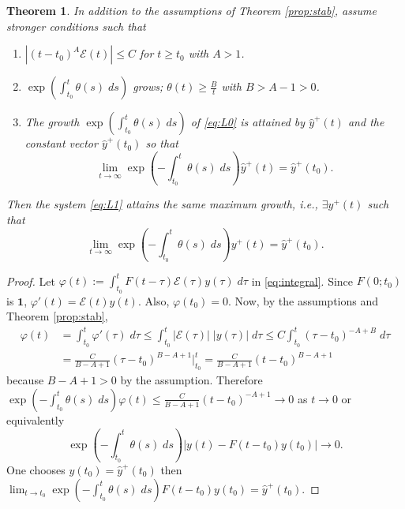 \documentclass[a4paper,11pt]{article}
\newtheorem{theorem}{Theorem}
\theoremstyle{remark}
\begin{document}
\begin{theorem} \label{prop:stab2}
In addition to the assumptions of Theorem \ref{prop:stab}, assume stronger conditions such that
\begin{enumerate}
  \item $|(t-t_0)^A \mathcal{E}(t)| \le C$ for $t\ge t_0$ with $A>1$. 
  \item $\exp\left(\int_{t_0}^t \theta(s)\; ds\right)$ grows; $\theta(t) \ge \frac{B}{t}$ with $B>A-1>0$.
  \item The growth $\exp\left(\int_{t_0}^t \theta(s)\; ds\right)$ of \eqref{eq:L0} is attained by $\hat{y}^+(t)$ and the constant vector $\hat{y}^+(t_0)$ so that 
  $$ \lim_{t \rightarrow \infty} \exp\left(-\int_{t_0}^t \theta(s)\; ds\right)\hat{y}^+(t) = \hat{y}^+(t_0).$$
\end{enumerate}
Then the system \eqref{eq:L1} attains the same maximum growth, i.e., $\exists {y}^+(t)$  such that
  $$ \lim_{t \rightarrow \infty} \exp\left(-\int_{t_0}^t \theta(s)\; ds\right){y}^+(t) = \hat{y}^+(t_0).$$
\end{theorem}
\begin{proof}
Let $\varphi(t):= \int_{t_0}^t F(t-\tau) \mathcal{E}(\tau)y(\tau) \; d\tau$ in \eqref{eq:integral}. Since $F(0;t_0)$ is $\mathbf{1}$, $\varphi'(t) = \mathcal{E}(t)y(t)$. Also, $\varphi(t_0)=0$. Now, by the assumptions and Theorem \ref{prop:stab},
\begin{align*}
 \varphi(t) &= \int_{t_0}^t \varphi'(\tau) \;d\tau \le \int_{t_0}^t |\mathcal{E}(\tau)|\;|y(\tau)| \;d\tau \le C\int_{t_0}^t (\tau-t_0)^{-A+B} \;d\tau \\
            &= \frac{C}{B-A+1} (\tau-t_0)^{B-A+1}\bigg|^t_{t_0} = \frac{C}{B-A+1} (t-t_0)^{B-A+1}
\end{align*}
because $B-A+1>0$ by the assumption. Therefore $\exp\left(-\int_{t_0}^t \theta(s)\; ds\right)\varphi(t) \le \frac{C}{B-A+1} (t-t_0)^{-A+1} \rightarrow 0$ as $t \rightarrow 0$ or equivalently
$$ \exp\left(-\int_{t_0}^t \theta(s)\; ds\right)\big|y(t)-F(t-t_0)y(t_0)\big| \rightarrow 0.$$
One chooses $y(t_0)=\hat{y}^+(t_0)$ then $\displaystyle\lim_{t\rightarrow t_0}\exp\left(-\int_{t_0}^t \theta(s)\; ds\right)F(t-t_0)y(t_0) = \hat{y}^+(t_0)$.
\end{proof}
\end{document}
